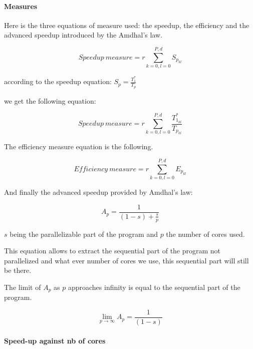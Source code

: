 \documentclass{sig-alternate}
\begin{document}

\paragraph{Measures}


Here is the three equations of measure used: the speedup, the efficiency and the advanced speedup introduced by the Amdhal's law.

$$Speedup\ measure = r \sum^{P,d}_{k=0,l=0} S_{p_{kl}}$$

according to the speedup equation: $S_p = \frac{T^*_1}{T_p}$

we get the following equation:

$$Speedup\ measure = r \sum^{P,d}_{k=0,l=0} \frac{T^*_{1_{kl}}}{T_{p_{kl}}}$$

The efficiency measure equation is the following.

$$Efficiency\ measure = r \sum^{P,d}_{k=0,l=0} E_{p_{kl}}$$

And finally the advanced speedup provided by Amdhal's law:

$$A_p = \frac{1}{(1-s) + \frac{s}{p}}$$

$s$ being the parallelizable part of the program and $p$ the number of cores used.

This equation allows to extract the sequential part of the program not parallelized and what ever number of cores we use, this sequential part will still be there.

The limit of $A_p$ as $p$ approaches infinity is equal to the sequential part of the program.

$$\lim_{p \to \infty} A_p = \frac{1}{(1-s)}$$

\paragraph{Speed-up against nb of cores} %
\end{document}
